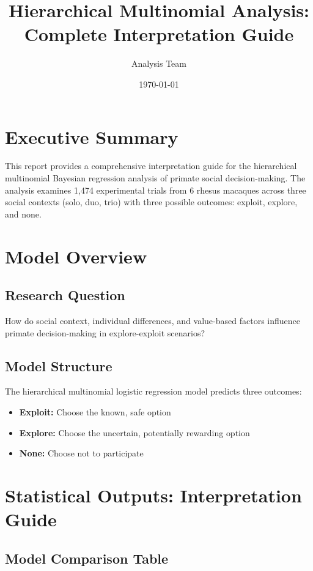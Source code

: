 \documentclass[11pt]{article}
\title{\textbf{Hierarchical Multinomial Analysis: Complete Interpretation Guide}}
\author{Analysis Team}
\date{\today}
\begin{document}
\maketitle

\section{Executive Summary}

This report provides a comprehensive interpretation guide for the hierarchical multinomial Bayesian regression analysis of primate social decision-making. The analysis examines 1,474 experimental trials from 6 rhesus macaques across three social contexts (solo, duo, trio) with three possible outcomes: exploit, explore, and none.

\section{Model Overview}

\subsection{Research Question}
How do social context, individual differences, and value-based factors influence primate decision-making in explore-exploit scenarios?

\subsection{Model Structure}
The hierarchical multinomial logistic regression model predicts three outcomes:
\begin{itemize}
    \item \textbf{Exploit:} Choose the known, safe option
    \item \textbf{Explore:} Choose the uncertain, potentially rewarding option
    \item \textbf{None:} Choose not to participate
\end{itemize}

\section{Statistical Outputs: Interpretation Guide}

\subsection{Model Comparison Table}
\end{document}
